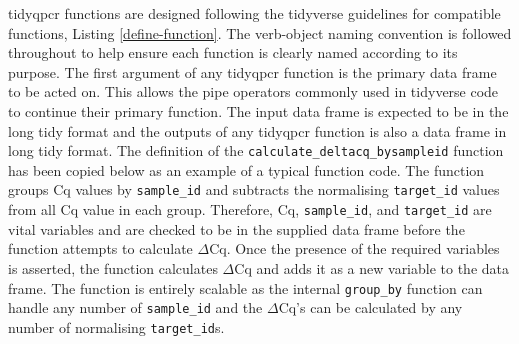 \documentclass[../main.tex]{subfiles}
\begin{document}
tidyqpcr functions are designed following the tidyverse guidelines for compatible functions, Listing \ref{define-function}. 
The verb-object naming convention is followed throughout to help ensure each function is clearly named according to its purpose. 
The first argument of any tidyqpcr function is the primary data frame to be acted on. 
This allows the pipe operators commonly used in tidyverse code to continue their primary function. 
The input data frame is expected to be in the long tidy format and the outputs of any tidyqpcr function is also a data frame in long tidy format. 
The definition of the \lstinline{calculate_deltacq_bysampleid} function has been copied below as an example of a typical function code. 
The function groups Cq values by \lstinline{sample_id} and subtracts the normalising \lstinline{target_id} values from all Cq value in each group. 
Therefore, Cq, \lstinline{sample_id}, and \lstinline{target_id} are vital variables and are checked to be in the supplied data frame before the function attempts to calculate $\Delta$Cq. 
Once the presence of the required variables is asserted, the function calculates $\Delta$Cq and adds it as a new variable to the data frame. 
The function is entirely scalable as the internal \lstinline{group_by} function can handle any number of \lstinline{sample_id} and the $\Delta$Cq's can be calculated by any number of normalising \lstinline{target_id}s.
\end{document}
